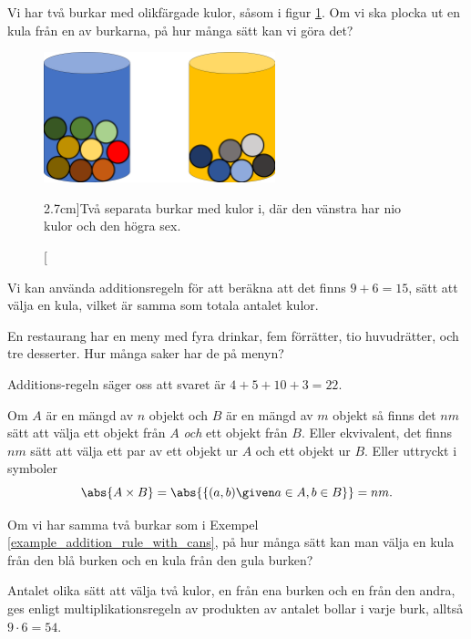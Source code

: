 \documentclass{tufte-handout}
\begin{document}
\begin{example}\label{example_addition_rule_with_cans}
    Vi har två burkar med olikfärgade kulor, såsom i figur \ref{fig:two_cans_of_balls}. Om vi ska plocka ut en kula från en av burkarna, på hur många sätt kan vi göra det?
\begin{figure}[h]
	\centering
    \includegraphics[width=0.6\textwidth]{graphics/burkar med kulor.png}
	\caption[][2.7cm]{Två separata burkar med kulor i, där den vänstra har nio kulor och den högra sex.}
	\label{fig:two_cans_of_balls}
\end{figure}

    Vi kan använda additionsregeln för att beräkna att det finns $9+6=15$, sätt att välja en kula, vilket är samma som totala antalet kulor.
\end{example}

\begin{example}\label{example_addition_rule}
	En restaurang har en meny med fyra drinkar, fem förrätter, tio huvudrätter, och tre desserter. Hur många saker har de på menyn?

	Additions-regeln säger oss att svaret är $4+5+10+3 = 22$.
\end{example}

\begin{definition}
	Om $A$ är en mängd av $n$ objekt och $B$ är en mängd av $m$ objekt så finns det $nm$ sätt att välja ett objekt från $A$ \emph{och} ett objekt från $B$. Eller ekvivalent, det finns $nm$ sätt att välja ett par av ett objekt ur $A$ och ett objekt ur $B$. Eller uttryckt i symboler
$$\abs{A\times B} = \abs{\{(a,b) \given a \in A, b \in B\}} = nm.$$
\end{definition}

\begin{example}
    Om vi har samma två burkar som i Exempel \ref{example_addition_rule_with_cans}, på hur många sätt kan man välja en kula från den blå burken och en kula från den gula burken?
	
    Antalet olika sätt att välja två kulor, en från ena burken och en från den andra, ges enligt multiplikationsregeln av produkten av antalet bollar i varje burk, alltså $9\cdot 6 = 54$.   
\end{example}
\end{document}

